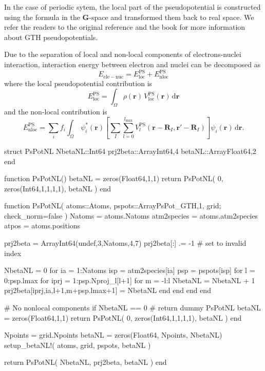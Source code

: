 In the case of periodic sytem, the local part of the pseudopotential
is constructed using the formula in the $\mathbf{G}$-space 
and transformed them back to real space.
We refer the readers to the original
reference \cite{Goedecker1996} and the book \cite{Marx2009}
for more information about GTH pseudopotentials.

Due to the separation of local and non-local components of electrons-nuclei
interaction, interaction energy between electron and nuclei can be decomposed as
\begin{equation}
E_{\mathrm{ele-nuc}} = E^{\mathrm{PS}}_{\mathrm{loc}}
+ E^{\mathrm{PS}}_{\mathrm{nloc}}
\end{equation}
%
where the local pseudopotential contribution is
\begin{equation}
E^{\mathrm{PS}}_{\mathrm{loc}} =
\int_{\Omega} \rho(\mathbf{r})\,V^{\mathrm{PS}}_{\mathrm{loc}}(\mathbf{r})\,
\mathrm{d}\mathbf{r}
\end{equation}
%
and the non-local contribution is
\begin{equation}
E^{\mathrm{PS}}_{\mathrm{nloc}} = 
\sum_{i}
f_{i}
\int_{\Omega}\,
\psi^{*}_{i}(\mathbf{r})
\left[
\sum_{I}\sum_{l=0}^{l_{\mathrm{max}}}
V^{\mathrm{PS}}_{l}(\mathbf{r}-\mathbf{R}_{I},\mathbf{r}'-\mathbf{R}_{I})
\right]
\psi_{i}(\mathbf{r})
\,\mathrm{d}\mathbf{r}.
\end{equation}

\begin{juliacode}
struct PsPotNL
  NbetaNL::Int64
  prj2beta::Array{Int64,4}
  betaNL::Array{Float64,2}
end
\end{juliacode}

\begin{juliacode}
function PsPotNL()
  betaNL = zeros(Float64,1,1)
  return PsPotNL( 0, zeros(Int64,1,1,1,1), betaNL )
end
\end{juliacode}

\begin{juliacode}
function PsPotNL( atoms::Atoms, pspots::Array{PsPot_GTH,1}, grid; check_norm=false )
  Natoms = atoms.Natoms
  atm2species = atoms.atm2species
  atpos = atoms.positions

  prj2beta = Array{Int64}(undef,3,Natoms,4,7)
  prj2beta[:] .= -1   # set to invalid index

  NbetaNL = 0
  for ia = 1:Natoms
    isp = atm2species[ia]
    psp = pspots[isp]
    for l = 0:psp.lmax
      for iprj = 1:psp.Nproj_l[l+1]
        for m = -l:l
          NbetaNL = NbetaNL + 1
          prj2beta[iprj,ia,l+1,m+psp.lmax+1] = NbetaNL
        end
      end
    end
  end

  # No nonlocal components
  if NbetaNL == 0
    # return dummy PsPotNL
    betaNL = zeros(Float64,1,1)
    return PsPotNL( 0, zeros(Int64,1,1,1,1), betaNL )
  end

  Npoints = grid.Npoints
  betaNL = zeros(Float64, Npoints, NbetaNL)
  setup_betaNL!( atoms, grid, pspots, betaNL )

  return PsPotNL( NbetaNL, prj2beta, betaNL )
end
\end{juliacode}


